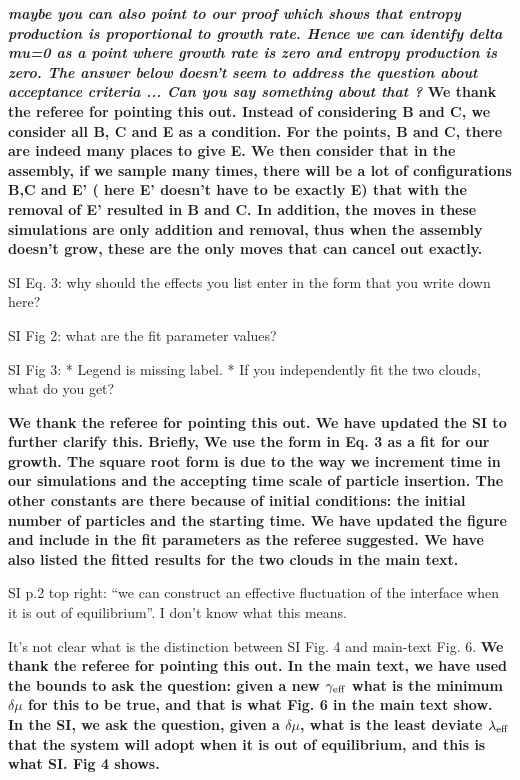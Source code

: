 \documentclass{letter}
\begin{document}
\begin{letter}{}
{\bf
{\it maybe you can also point to our proof which shows that entropy production is proportional to  growth rate. Hence we can identify delta mu=0 as a point where growth rate is zero and entropy production is zero. The answer below doesn't seem to address the question about acceptance criteria ... Can you say something about that ? }We thank the referee for pointing this out. Instead of considering B and C, we consider all B, C and E as a condition. For the points, B and C, there are indeed many places to give E. We then consider that in the assembly, if we sample many times, there will be a lot of configurations B,C and E' ( here E' doesn't have to be exactly E) that with the removal of E' resulted in B and C. In addition, the moves in these simulations are only addition and removal, thus when the assembly doesn't grow, these are the only moves that can cancel out exactly.}

SI Eq. 3: why should the effects you list enter in the form that you 
write down here? 

SI Fig 2: what are the fit parameter values? 

SI Fig 3: * Legend is missing label. * If you independently fit the 
two clouds, what do you get? 

{\bf
We thank the referee for pointing this out. We have updated the SI to further clarify this. Briefly, We use the form in Eq. 3 as a fit for our growth. The square root form is due to the way we increment time in our simulations and the accepting time scale of particle insertion. The other constants are there because of initial conditions: the initial number of particles and the starting time. We have updated the figure and include in the fit parameters as the referee suggested. We have also listed the fitted results for the two clouds in the main text.}

SI p.2 top right: “we can construct an effective fluctuation of the 
interface when it is out of equilibrium”. I don’t know what this 
means. 

It’s not clear what is the distinction between SI Fig. 4 and main-text 
Fig. 6. 
{\bf
We thank the referee for pointing this out. In the main text, we have used the bounds to ask the question: given a new $\gamma_{\rm eff}$ what is the minimum $\delta\mu$ for this to be true, and that is what Fig. 6 in the main text show. In the SI, we ask the question, given a $\delta\mu$, what is the least deviate $\lambda_{\rm eff}$ that the system will adopt when it is out of equilibrium, and this is what SI. Fig 4 shows.}


\end{letter}
\end{document}
